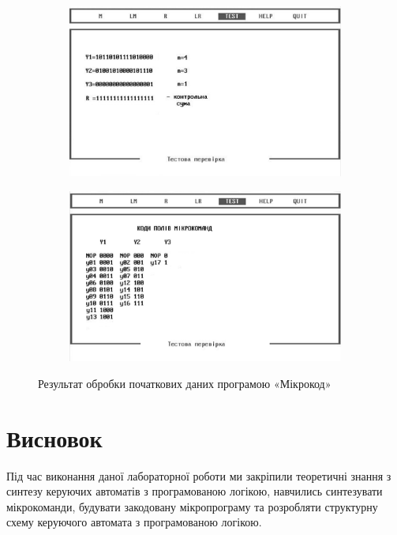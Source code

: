 \documentclass[a4paper,oneside,DIV=12,12pt,headings=normal]{scrartcl}
\begin{document}
			\begin{figure}[!htbp]
			\centering
				\begin{subfigure}[t]{0.5\linewidth - 1em}
				\centering
					\includegraphics[width = \linewidth]{./assets/00-bw.png}
				\caption{}
				\end{subfigure}
				\quad
				\begin{subfigure}[t]{0.5\linewidth - 1em}
				\centering
					\includegraphics[width = \linewidth]{./assets/01-bw.png}
				\caption{}
				\end{subfigure}
			\caption{Результат обробки початкових даних програмою «Мікрокод»}
			\label{fig:mikrokod-result}
			\end{figure}
			
	\section{Висновок}
		Під час виконання даної лабораторної роботи ми закріпили теоретичні знання з синтезу керуючих автоматів з програмованою логікою, навчились синтезувати мікрокоманди, будувати закодовану мікропрограму та розробляти структурну схему керуючого автомата з програмованою логікою.
\end{document}
